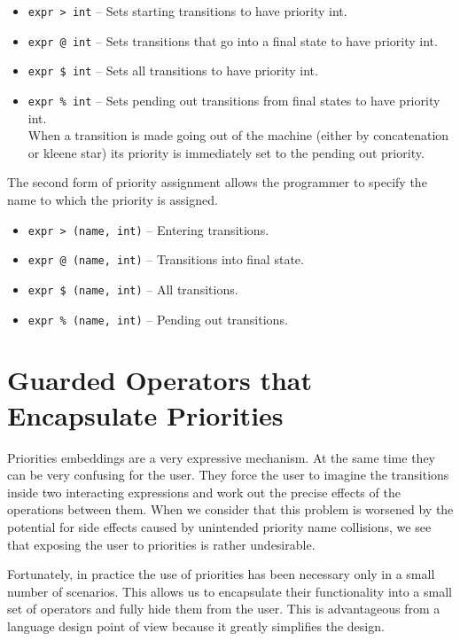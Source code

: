 \documentclass[letterpaper,11pt,oneside]{book}
\begin{document}
\begin{itemize}
\setlength{\parskip}{0in}
\item \verb|expr > int| -- Sets starting transitions to have priority int.
\item \verb|expr @ int| -- Sets transitions that go into a final state to have priority int. 
\item \verb|expr $ int| -- Sets all transitions to have priority int.
\item \verb|expr % int| -- Sets pending out transitions from final states to
have priority int.\\ When a transition is made going out of the machine (either
by concatenation or kleene star) its priority is immediately set to the pending
out priority.  
\end{itemize}

The second form of priority assignment allows the programmer to specify the name
to which the priority is assigned.

\begin{itemize}
\setlength{\parskip}{0in}
\item \verb|expr > (name, int)| -- Entering transitions.
\item \verb|expr @ (name, int)| -- Transitions into final state.
\item \verb|expr $ (name, int)| -- All transitions.
\item \verb|expr % (name, int)| -- Pending out transitions.
\end{itemize}

\section{Guarded Operators that Encapsulate Priorities}

Priorities embeddings are a very expressive mechanism. At the same time they
can be very confusing for the user. They force the user to imagine
the transitions inside two interacting expressions and work out the precise
effects of the operations between them. When we consider
that this problem is worsened by the
potential for side effects caused by unintended priority name collisions, we
see that exposing the user to priorities is rather undesirable.

Fortunately, in practice the use of priorities has been necessary only in a
small number of scenarios.  This allows us to encapsulate their functionality
into a small set of operators and fully hide them from the user. This is
advantageous from a language design point of view because it greatly simplifies
the design.  
\end{document}
